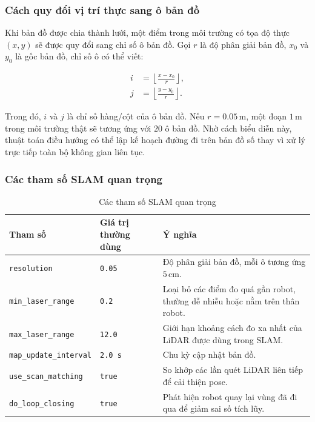 \subsubsection{Cách quy đổi vị trí thực sang ô bản đồ}
\label{subsubsec:world-to-grid}

Khi bản đồ được chia thành lưới, một điểm trong môi trường có tọa độ thực $(x,y)$ sẽ được quy đổi sang chỉ số ô bản đồ. Gọi $r$ là độ phân giải bản đồ, $x_0$ và $y_0$ là gốc bản đồ, chỉ số ô có thể viết:

\begin{align}
    i &= \left\lfloor \frac{x-x_0}{r} \right\rfloor, \label{eq:grid-index-i}\\
    j &= \left\lfloor \frac{y-y_0}{r} \right\rfloor. \label{eq:grid-index-j}
\end{align}

Trong đó, $i$ và $j$ là chỉ số hàng/cột của ô bản đồ. Nếu $r=0.05\,\mathrm{m}$, một đoạn $1\,\mathrm{m}$ trong môi trường thật sẽ tương ứng với $20$ ô bản đồ. Nhờ cách biểu diễn này, thuật toán điều hướng có thể lập kế hoạch đường đi trên bản đồ số thay vì xử lý trực tiếp toàn bộ không gian liên tục.

\subsubsection{Các tham số SLAM quan trọng}
\label{subsubsec:slam-parameters}

\begin{table}[H]
    \centering
    \caption{Các tham số SLAM quan trọng}
    \label{tab:slam-parameters}
    \renewcommand{\arraystretch}{1.25}
    \small
    \begin{tabularx}{\textwidth}{|>{\raggedright\arraybackslash}p{}|>{\raggedright\arraybackslash}p{}|>{\raggedright\arraybackslash}X|}
        \hline
        \textbf{Tham số} & \textbf{Giá trị thường dùng} & \textbf{Ý nghĩa} \\
        \hline
        \texttt{resolution} & \texttt{0.05} & Độ phân giải bản đồ, mỗi ô tương ứng $5\,\mathrm{cm}$. \\
        \hline
        \texttt{min\_laser\_range} & \texttt{0.2} & Loại bỏ các điểm đo quá gần robot, thường dễ nhiễu hoặc nằm trên thân robot. \\
        \hline
        \texttt{max\_laser\_range} & \texttt{12.0} & Giới hạn khoảng cách đo xa nhất của LiDAR được dùng trong SLAM. \\
        \hline
        \texttt{map\_update\_interval} & \texttt{2.0 s} & Chu kỳ cập nhật bản đồ. \\
        \hline
        \texttt{use\_scan\_matching} & \texttt{true} & So khớp các lần quét LiDAR liên tiếp để cải thiện pose. \\
        \hline
        \texttt{do\_loop\_closing} & \texttt{true} & Phát hiện robot quay lại vùng đã đi qua để giảm sai số tích lũy. \\
        \hline
    \end{tabularx}
\end{table}

